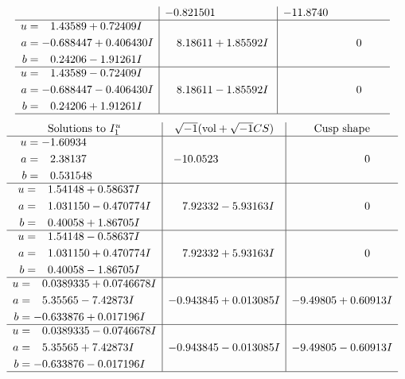 \documentclass[1p]{elsarticle_modified}
\theoremstyle{definition}
\newcommand{\I}{\sqrt{-1}}
\begin{document}
$$\begin{array}{c|c|c}
 & -0.821501\phantom{ +0.000000I} & -11.8740\phantom{ +0.000000I} \\ \hline\begin{aligned}
u &= \phantom{-}1.43589 + 0.72409 I \\
a &= -0.688447 + 0.406430 I \\
b &= \phantom{-}0.24206 - 1.91261 I\end{aligned}
 & \phantom{-}8.18611 + 1.85592 I & \phantom{-0.000000 } 0 \\ \hline\begin{aligned}
u &= \phantom{-}1.43589 - 0.72409 I \\
a &= -0.688447 - 0.406430 I \\
b &= \phantom{-}0.24206 + 1.91261 I\end{aligned}
 & \phantom{-}8.18611 - 1.85592 I & \phantom{-0.000000 } 0\\
 \hline 
 \end{array}$$\newpage$$\begin{array}{c|c|c}  
\text{Solutions to }I^u_{1}& \I (\text{vol} + \sqrt{-1}CS) & \text{Cusp shape}\\
 \hline 
\begin{aligned}
u &= -1.60934\phantom{ +0.000000I} \\
a &= \phantom{-}2.38137\phantom{ +0.000000I} \\
b &= \phantom{-}0.531548\phantom{ +0.000000I}\end{aligned}
 & -10.0523\phantom{ +0.000000I} & \phantom{-0.000000 } 0 \\ \hline\begin{aligned}
u &= \phantom{-}1.54148 + 0.58637 I \\
a &= \phantom{-}1.031150 - 0.470774 I \\
b &= \phantom{-}0.40058 + 1.86705 I\end{aligned}
 & \phantom{-}7.92332 - 5.93163 I & \phantom{-0.000000 } 0 \\ \hline\begin{aligned}
u &= \phantom{-}1.54148 - 0.58637 I \\
a &= \phantom{-}1.031150 + 0.470774 I \\
b &= \phantom{-}0.40058 - 1.86705 I\end{aligned}
 & \phantom{-}7.92332 + 5.93163 I & \phantom{-0.000000 } 0 \\ \hline\begin{aligned}
u &= \phantom{-}0.0389335 + 0.0746678 I \\
a &= \phantom{-}5.35565 - 7.42873 I \\
b &= -0.633876 + 0.017196 I\end{aligned}
 & -0.943845 + 0.013085 I & -9.49805 + 0.60913 I \\ \hline\begin{aligned}
u &= \phantom{-}0.0389335 - 0.0746678 I \\
a &= \phantom{-}5.35565 + 7.42873 I \\
b &= -0.633876 - 0.017196 I\end{aligned}
 & -0.943845 - 0.013085 I & -9.49805 - 0.60913 I\\
 \hline 
 \end{array}$$\newpage\newpage\renewcommand{\arraystretch}{1}
\end{document}
